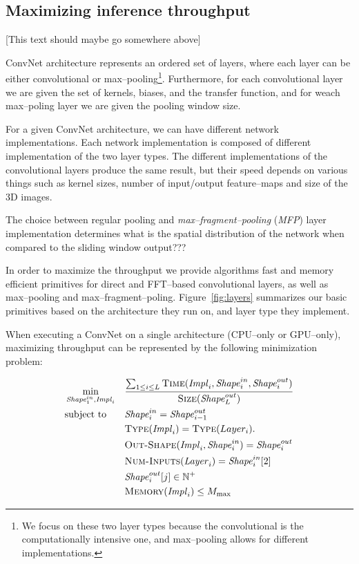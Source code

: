 \documentclass[conference]{IEEEtran}
\begin{document}
  \subsection{Maximizing inference throughput}

  [This text should maybe go somewhere above]

  ConvNet architecture represents an ordered set of layers, where each
  layer can be either convolutional or max--pooling\footnote{We focus
    on these two layer types because the convolutional is the
    computationally intensive one, and max--pooling allows for
    different implementations.}.  Furthermore, for each convolutional
  layer we are given the set of kernels, biases, and the transfer
  function, and for weach max--poling layer we are given the pooling
  window size.

  For a given ConvNet architecture, we can have different network
  implementations.  Each network implementation is composed of
  different implementation of the two layer types.  The different
  implementations of the convolutional layers produce the same result,
  but their speed depends on various things such as kernel sizes,
  number of input/output feature--maps and size of the 3D images.

  The choice between regular pooling and \emph{max--fragment--pooling}
  (\emph{MFP}) layer implementation determines what is the spatial
  distribution of the network when compared to the sliding window
  output???

  In order to maximize the throughput we provide algorithms fast and
  memory efficient primitives for direct and FFT--based convolutional
  layers, as well as max--pooling and max--fragment--poling.
  Figure~\ref{fig:layers} summarizes our basic primitives based on the
  architecture they run on, and layer type they implement.

  When executing a ConvNet on a single architecture (CPU--only or
  GPU--only), maximizing throughput can be represented by the
  following minimization problem:

  \begin{equation*}
    \begin{aligned}
      & \min_{\id{Shape}^{in}_1, \id{Impl}_i}
      & & \frac{\sum_{1 \le i \le L} \proc{Time}(\id{Impl}_i,\id{Shape}^{in}_i,\id{Shape}^{out}_i)}
      { \proc{Size}( \id{Shape}^{out}_L)} \\
      & \textrm{subject to} & &
      \id{Shape}^{in}_i = \id{Shape}^{out}_{i-1} \\
      & & &
      \proc{Type}(\id{Impl}_i) = \proc{Type}(Layer_i). \\
      & & &
      \proc{Out-Shape}(\id{Impl}_i,\id{Shape}^{in}_i) = \id{Shape}^{out}_i \\
      & & &
      \proc{Num-Inputs}(\id{Layer}_i) = \id{Shape}^{in}_i[2] \\
      & & &
      \id{Shape}^{out}_i[j] \in \mathbb{N}^+ \\
      & & &
      \proc{Memory}(\id{Impl}_i) \le M_{\max} \\
    \end{aligned}
  \end{equation*}
\end{document}
